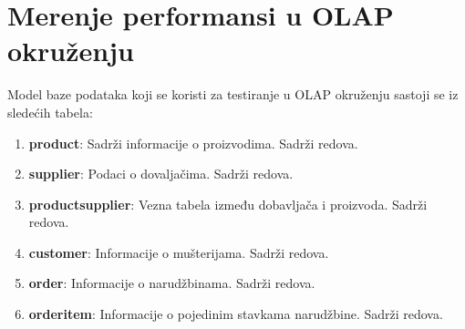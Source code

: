 \documentclass[12pt,oneside]{memoir}
\begin{document}
\pagebreak

\section{Merenje performansi u OLAP okruženju}

Model baze podataka koji se koristi za testiranje u OLAP okruženju  sastoji se iz sledećih tabela:

\begin{enumerate}
\item[\textbullet] \textbf{product}: {
	Sadrži informacije o proizvodima. Sadrži  redova.
}
\item[\textbullet] \textbf{supplier}:{
	Podaci o dovaljačima. Sadrži   redova.
}
\item[\textbullet] \textbf{productsupplier}:{
	Vezna tabela između dobavljača i proizvoda. Sadrži   redova.
}
\item[\textbullet] \textbf{customer}:{
	Informacije o mušterijama. Sadrži   redova.
}
\item[\textbullet] \textbf{order}:{
	Informacije o narudžbinama. Sadrži   redova.
}
\item[\textbullet] \textbf{orderitem}:{
	Informacije o pojedinim stavkama narudžbine. Sadrži   redova.
}
\end{enumerate}
\end{document}
